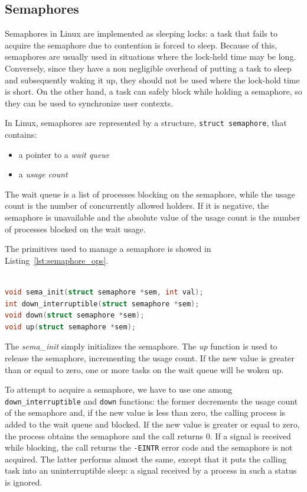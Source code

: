 \subsection{Semaphores\label{sec:semaphores}}

Semaphores in Linux are implemented as sleeping locks: a task that fails to acquire the
semaphore due to contention is forced to sleep. Because of this, semaphores are usually
used in situations where the lock-held time may be long. Conversely, since they have a
non negligible overhead of putting a task to sleep and subsequently waking it up, they
should not be used where the lock-hold time is short. On the other hand, a task can 
safely block while holding a semaphore, so they can be used to synchronize user contexts.

In Linux, semaphores are represented by a structure, \texttt{struct semaphore}, that
contains:

\begin{itemize}

\item a pointer to a \emph{wait queue}
\item a \emph{usage count}

\end{itemize}

The wait queue is a list of processes blocking on the semaphore, while the usage count 
is the number of concurrently allowed holders. If it is negative, the semaphore is
unavailable and the absolute value of the usage count is the number of processes
blocked on the wait usage.

The primitives used to manage a semaphore is showed in Listing~\ref{lst:semaphore_ops}.

\begin{lstlisting}[language=C, caption={Semaphore operations},
			label={lst:semaphore_ops}]

void sema_init(struct semaphore *sem, int val);
int down_interruptible(struct semaphore *sem);
void down(struct semaphore *sem);
void up(struct semaphore *sem);

\end{lstlisting}

The \emph{sema\_init} simply initializes the semaphore. The \emph{up} function is used to
release the semaphore, incrementing the usage count. If the new value is greater than or
equal to zero, one or more tasks on the wait queue will be woken up.

To attempt to acquire a semaphore, we have to use one among \texttt{down\_interruptible}
and \texttt{down} functions: the former decrements the usage count of the semaphore and,
if the new value is less than zero, the calling process is added to the wait queue and
blocked. If the new value is greater or equal to zero, the process obtains the semaphore
and the call returns 0. If a signal is received while blocking, the call returns the
\texttt{-EINTR} error code and the semaphore is not acquired. The latter performs almost
the same, except that it puts the calling task into an uninterruptible sleep: a signal
received by a process in such a status is ignored.

